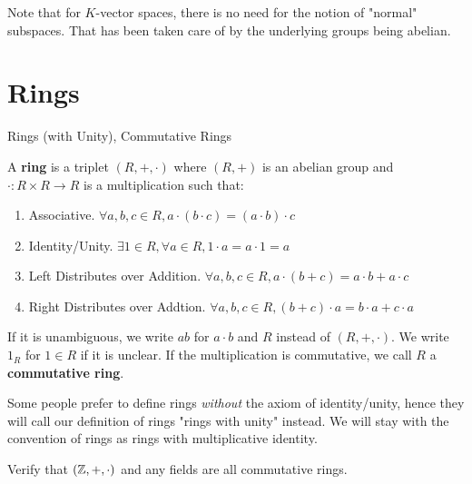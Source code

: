 \documentclass[../book.tex]{subfiles}
\begin{document}
\begin{rmk}
    Note that for $K$-vector spaces, there is no need 
    for the notion of "normal" subspaces. 
    That has been taken care of by the underlying groups being abelian.
\end{rmk}


\section{Rings}
\begin{dfn} Rings (with Unity), Commutative Rings
    
    A \textbf{ring} is a triplet $(R,+,\cdot)$ where
    $(R,+)$ is an abelian group and 
    $\cdot : R \times R \to R$ is a multiplication such that:
    \begin{enumerate}
        \item Associative. 
        $\forall a, b, c \in R, a \cdot (b \cdot c) = (a \cdot b) \cdot c$
        \item Identity/Unity. 
        $\exists 1 \in R, \forall a \in R, 1 \cdot a = a \cdot 1 = a$
        \item Left Distributes over Addition. 
        $\forall a, b, c \in R, a\cdot(b + c) = a\cdot b + a\cdot c$
        \item Right Distributes over Addtion.
        $\forall a, b, c \in R, (b + c)\cdot a = b\cdot a + c\cdot a$
    \end{enumerate}
    If it is unambiguous, we write $ab$ for $a\cdot b$ and
    $R$ instead of $(R,+,\cdot)$. 
    We write $1_R$ for $1 \in R$ if it is unclear. 
    If the multiplication is commutative, we call $R$ a \textbf{commutative ring}.
    
    Some people prefer to define rings \emph{without} the axiom of identity/unity,
    hence they will call our definition of rings "rings with unity" instead. 
    We will stay with the convention of rings as rings with multiplicative identity.
    
\end{dfn}

\begin{ex}
    Verify that $(\mathbb{Z},+,\cdot)$ and any fields are all commutative rings. 
\end{ex}
\end{document}
